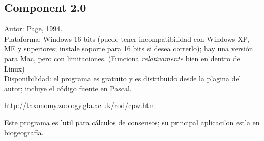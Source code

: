 \subsection{Component 2.0}
\noindent
Autor: Page, 1994. \\
Plataforma: Windows 16 bits (puede tener incompatibilidad con Windows XP, ME y superiores; instale soporte para 16 bits si desea correrlo); hay una versi\'on para Mac, pero con limitaciones.  (Funciona \textit{relativamente} bien en  dentro de Linux)\\
Disponibilidad: el programa es gratuito y es distribuido desde la p'agina del autor; incluye el c\'odigo fuente en Pascal.

\url{http://taxonomy.zoology.gla.ac.uk/rod/cpw.html}


Este programa es 'util para c\'alculos de consensos; su principal aplicaci'on est'a en biogeograf\'ia.
